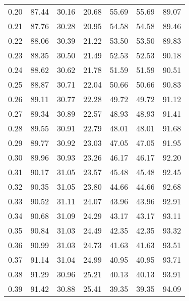 \begin{tabular}{|c|c|c|c|c|c|c|}
      0.20 &     87.44 &     30.16 &      20.68 &   55.69 &      55.69 &         89.07 \\
      0.21 &     87.76 &     30.28 &      20.95 &   54.58 &      54.58 &         89.46 \\
      0.22 &     88.06 &     30.39 &      21.22 &   53.50 &      53.50 &         89.83 \\
      0.23 &     88.35 &     30.50 &      21.49 &   52.53 &      52.53 &         90.18 \\
      0.24 &     88.62 &     30.62 &      21.78 &   51.59 &      51.59 &         90.51 \\
      0.25 &     88.87 &     30.71 &      22.04 &   50.66 &      50.66 &         90.83 \\
      0.26 &     89.11 &     30.77 &      22.28 &   49.72 &      49.72 &         91.12 \\
      0.27 &     89.34 &     30.89 &      22.57 &   48.93 &      48.93 &         91.41 \\
      0.28 &     89.55 &     30.91 &      22.79 &   48.01 &      48.01 &         91.68 \\
      0.29 &     89.77 &     30.92 &      23.03 &   47.05 &      47.05 &         91.95 \\
      0.30 &     89.96 &     30.93 &      23.26 &   46.17 &      46.17 &         92.20 \\
      0.31 &     90.17 &     31.05 &      23.57 &   45.48 &      45.48 &         92.45 \\
      0.32 &     90.35 &     31.05 &      23.80 &   44.66 &      44.66 &         92.68 \\
      0.33 &     90.52 &     31.11 &      24.07 &   43.96 &      43.96 &         92.91 \\
      0.34 &     90.68 &     31.09 &      24.29 &   43.17 &      43.17 &         93.11 \\
      0.35 &     90.84 &     31.03 &      24.49 &   42.35 &      42.35 &         93.32 \\
      0.36 &     90.99 &     31.03 &      24.73 &   41.63 &      41.63 &         93.51 \\
      0.37 &     91.14 &     31.04 &      24.99 &   40.95 &      40.95 &         93.71 \\
      0.38 &     91.29 &     30.96 &      25.21 &   40.13 &      40.13 &         93.91 \\
      0.39 &     91.42 &     30.88 &      25.41 &   39.35 &      39.35 &         94.09 \\

\end{tabular}
